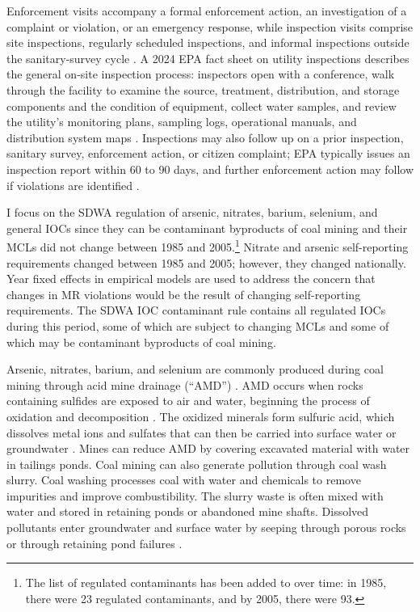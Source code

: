 \documentclass[12pt]{article}
\begin{document}
Enforcement visits accompany a formal enforcement action, an investigation of a complaint or violation, or an emergency response, while inspection visits comprise site inspections, regularly scheduled inspections, and informal inspections outside the sanitary-survey cycle \parencite{epaSDWAEchoDownload}. A 2024 EPA fact sheet on utility inspections describes the general on-site inspection process: inspectors open with a conference, walk through the facility to examine the source, treatment, distribution, and storage components and the condition of equipment, collect water samples, and review the utility's monitoring plans, sampling logs, operational manuals, and distribution system maps \parencite{epaInspectionFactsheet2024}. Inspections may also follow up on a prior inspection, sanitary survey, enforcement action, or citizen complaint; EPA typically issues an inspection report within 60 to 90 days, and further enforcement action may follow if violations are identified \parencite{epaInspectionFactsheet2024}.

I focus on the SDWA regulation of arsenic, nitrates, barium, selenium, and general IOCs since they can be contaminant byproducts of coal mining and their MCLs did not change between 1985 and 2005.\footnote{The list of regulated contaminants has been added to over time: in 1985, there were 23 regulated contaminants, and by 2005, there were 93.} Nitrate and arsenic self-reporting requirements changed between 1985 and 2005; however, they changed nationally. Year fixed effects in empirical models are used to address the concern that changes in MR violations would be the result of changing self-reporting requirements. The SDWA IOC contaminant rule contains all regulated IOCs during this period, some of which are subject to changing MCLs and some of which may be contaminant byproducts of coal mining. 

Arsenic, nitrates, barium, and selenium are commonly produced during coal mining through acid mine drainage (``AMD'') \parencite{liang2017spatial, boente2020benzo, rouhani2023overview}. AMD occurs when rocks containing sulfides are exposed to air and water, beginning the process of oxidation and decomposition \parencite{ceto2000abandoned}. The oxidized minerals form sulfuric acid, which dissolves metal ions and sulfates that can then be carried into surface water or groundwater \parencite{akcil2006acid, skousen2019acid}. Mines can reduce AMD by covering excavated material with water in tailings ponds. Coal mining can also generate pollution through coal wash slurry. Coal washing processes coal with water and chemicals to remove impurities and improve combustibility. The slurry waste is often mixed with water and stored in retaining ponds or abandoned mine shafts. Dissolved pollutants enter groundwater and surface water by seeping through porous rocks or through retaining pond failures \parencite{Sealey2000}.
\end{document}
